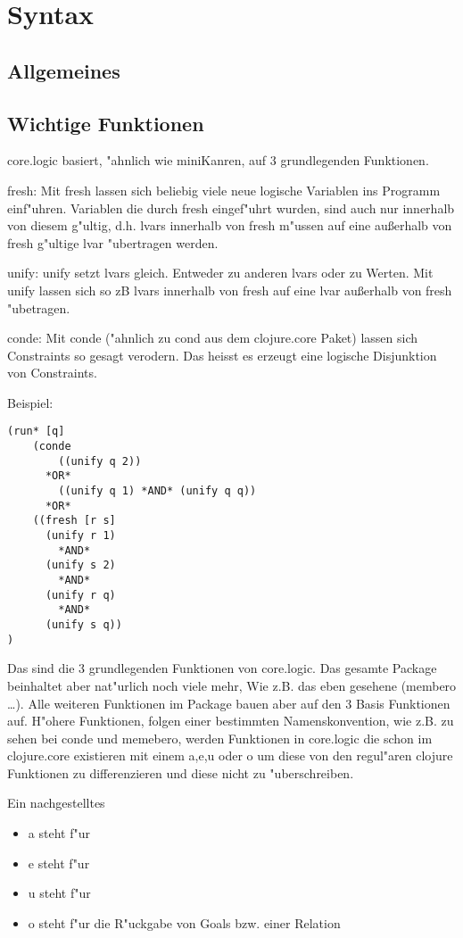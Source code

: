\section{Syntax}

\subsection{Allgemeines}



\subsection{Wichtige Funktionen}

core.logic basiert, "ahnlich wie miniKanren, auf 3 grundlegenden Funktionen.

fresh:
Mit fresh lassen sich beliebig viele neue logische Variablen ins Programm einf"uhren. Variablen die durch fresh eingef"uhrt wurden, sind auch nur innerhalb von diesem g"ultig, d.h. lvars innerhalb von fresh m"ussen auf eine au\ss{}erhalb von fresh g"ultige lvar "ubertragen werden.

unify:
unify setzt lvars gleich. Entweder zu anderen lvars oder zu Werten. Mit unify lassen sich so zB lvars innerhalb von fresh auf eine lvar au\ss{}erhalb von fresh "ubetragen.

conde:
Mit conde ("ahnlich zu cond aus dem clojure.core Paket) lassen sich Constraints so gesagt \dq{}verodern\dq{}. Das heiss{}t es erzeugt eine logische Disjunktion von Constraints.

Beispiel:
\begin{lstlisting}
(run* [q]
    (conde
        ((unify q 2))
	  *OR*
        ((unify q 1) *AND* (unify q q))
	  *OR*
	((fresh [r s] 
	  (unify r 1)
	    *AND*
	  (unify s 2)
	    *AND*
	  (unify r q)
	    *AND*
	  (unify s q))
)
\end{lstlisting}

Das sind die 3 grundlegenden Funktionen von core.logic. Das gesamte Package beinhaltet aber nat"urlich noch viele mehr, Wie z.B. das eben gesehene (membero \dots{}). Alle weiteren Funktionen im Package bauen aber auf den 3 Basis Funktionen auf. H"ohere Funktionen, folgen einer bestimmten Namenskonvention, wie z.B. zu sehen bei conde und memebero, werden Funktionen in core.logic die schon im clojure.core existieren mit einem a,e,u oder o um diese von den regul"aren clojure Funktionen zu differenzieren und diese nicht zu "uberschreiben.

Ein nachgestelltes 
\begin{itemize}
  \item a steht f"ur 
  
  \item e steht f"ur 
  
  \item u steht f"ur 
  
  \item o steht f"ur die R"uckgabe von Goals bzw. einer Relation

\end{itemize}

